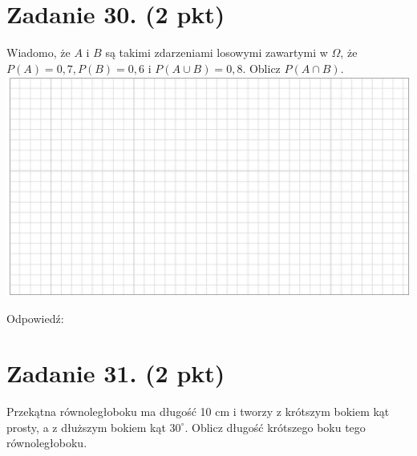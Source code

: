 \documentclass[10pt]{article}
\begin{document}
\section*{Zadanie 30. (2 pkt)}
Wiadomo, że \(A\) i \(B\) są takimi zdarzeniami losowymi zawartymi w \(\Omega\), że \(P(A)=0,7, P(B)=0,6\) i \(P(A \cup B)=0,8\). Oblicz \(P(A \cap B)\).\\
\includegraphics[max width=\textwidth, center]{2024_11_21_3a102e13f4b06a61f46fg-12}

Odpowiedź: \(\qquad\)

\section*{Zadanie 31. (2 pkt)}
Przekątna równoległoboku ma długość 10 cm i tworzy z krótszym bokiem kąt prosty, a z dłuższym bokiem kąt \(30^{\circ}\). Oblicz długość krótszego boku tego równoległoboku.
\end{document}
